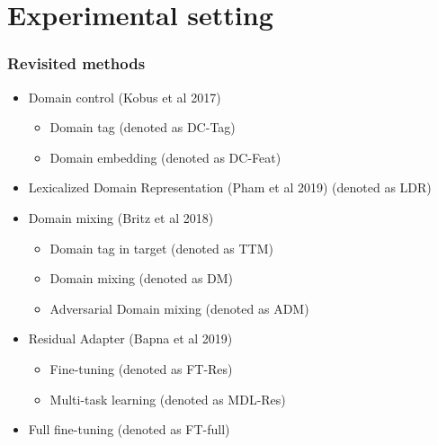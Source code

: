 \documentclass{beamer}
\begin{document}
\section{Experimental setting} %

\begin{frame}
\frametitle{Revisited methods}
\begin{itemize}
	\item<1-> Domain control (Kobus et al 2017)
	\begin{itemize}
		\item<2-> Domain tag (denoted as DC-Tag)
		\item<3-> Domain embedding (denoted as DC-Feat)
	\end{itemize}
	\item<4-> Lexicalized Domain Representation (Pham et al 2019) (denoted as LDR)
	\item<5-> Domain mixing (Britz et al 2018)
	\begin{itemize}
		\item<6-> Domain tag in target (denoted as TTM)
		\item<7-> Domain mixing (denoted as DM)
		\item<8-> Adversarial Domain mixing (denoted as ADM)
	\end{itemize}
	\item<9-> Residual Adapter (Bapna et al 2019)
	\begin{itemize}
		\item<10-> Fine-tuning (denoted as FT-Res)
		\item<11-> Multi-task learning (denoted as MDL-Res)
	\end{itemize}
	\item<12-> Full fine-tuning (denoted as FT-full)
\end{itemize}
\end{frame}
\end{document}
